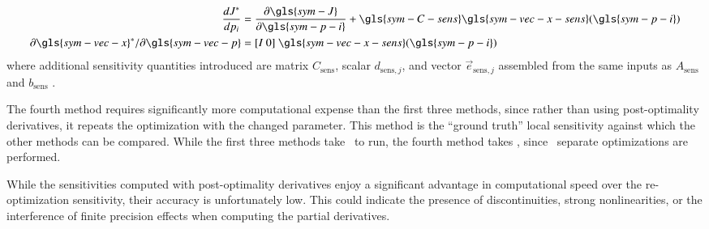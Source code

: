 \begin{equation}
\begin{aligned}
    \frac{dJ^*}{dp_i} &=  \frac{\partial \gls{sym-J}}{\partial \gls{sym-p-i}} + \gls{sym-C-sens}\gls{sym-vec-x-sens}(\gls{sym-p-i}) \\
    \partial \gls{sym-vec-x}^*/\partial \gls{sym-vec-p} &=  [I ~0] ~\gls{sym-vec-x-sens}(\gls{sym-p-i}) \\
\end{aligned}
\end{equation}
where additional sensitivity quantities introduced are matrix $C_{\text{sens}}$, scalar $d_{\text{sens},j}$, and vector $\vec{e}_{\text{sens},j}$ assembled from the same inputs as $A_{\text{sens}}$ and $b_{\text{sens}}$ \citep{sobieszczanski-sobieski_sensitivity_1982}.


The fourth method requires significantly more computational expense than the first three methods, since rather than using post-optimality derivatives, it repeats the optimization with the changed parameter.
This method is the ``ground truth'' local sensitivity against which the other methods can be compared.
While the first three methods take \resultsRE[gradientSensRuntime]~to run, the fourth method takes \resultsRE[reoptimSensRuntime], since \resultsRE[numReoptims]~separate optimizations are performed.

While the sensitivities computed with post-optimality derivatives enjoy a significant advantage in computational speed over the re-optimization sensitivity, their accuracy is unfortunately low.
This could indicate the presence of discontinuities, strong nonlinearities, or the interference of finite precision effects when computing the partial derivatives.

